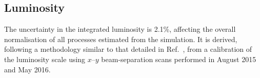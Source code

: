 
\subsection{Luminosity}
\label{sec:syst_lumi}

The uncertainty in the integrated luminosity is 2.1\%, affecting the overall normalisation of
all processes estimated from the simulation. It is derived, following a methodology similar to that detailed in Ref.~\cite{Aaboud:2016hhf}, 
from a calibration of the luminosity scale using $x$--$y$ beam-separation scans performed in August 2015 and May 2016.

